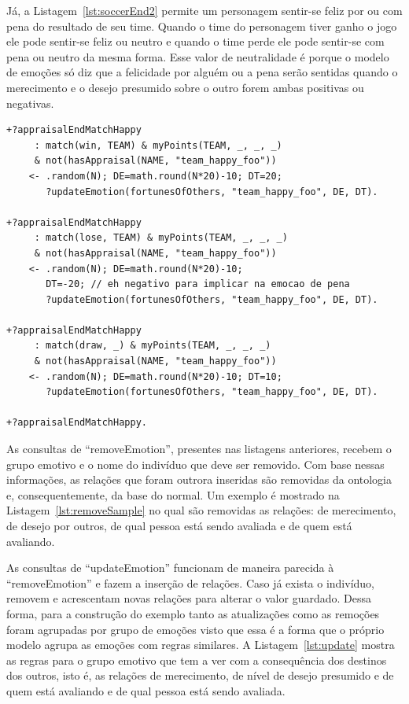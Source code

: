 Já, a Listagem~\ref{lst:soccerEnd2} permite um personagem sentir-se feliz
por ou com pena do resultado de seu time. Quando o time do personagem
tiver ganho o jogo ele pode sentir-se feliz ou neutro e quando o time perde
ele pode sentir-se com pena ou neutro da mesma forma. Esse valor de
neutralidade é porque o modelo de emoções só diz que a felicidade por alguém
ou a pena serão sentidas quando o merecimento e o desejo presumido sobre o
outro forem ambas positivas ou negativas.

\begin{center}
    \begin{minipage}{140mm}
	\lstset{linewidth=140mm}
	\begin{lstlisting}[frame=trbl,
caption=Parte do código do agente referente à avaliação do final do jogo para
as emoções relacionadas com a consequência de eventos para outros.,
label=lst:soccerEnd2]
+?appraisalEndMatchHappy
     : match(win, TEAM) & myPoints(TEAM, _, _, _)
     & not(hasAppraisal(NAME, "team_happy_foo"))
    <- .random(N); DE=math.round(N*20)-10; DT=20;
       ?updateEmotion(fortunesOfOthers, "team_happy_foo", DE, DT).

+?appraisalEndMatchHappy
     : match(lose, TEAM) & myPoints(TEAM, _, _, _)
     & not(hasAppraisal(NAME, "team_happy_foo"))
    <- .random(N); DE=math.round(N*20)-10;
       DT=-20; // eh negativo para implicar na emocao de pena
       ?updateEmotion(fortunesOfOthers, "team_happy_foo", DE, DT).

+?appraisalEndMatchHappy
     : match(draw, _) & myPoints(TEAM, _, _, _)
     & not(hasAppraisal(NAME, "team_happy_foo"))
    <- .random(N); DE=math.round(N*20)-10; DT=10;
       ?updateEmotion(fortunesOfOthers, "team_happy_foo", DE, DT).

+?appraisalEndMatchHappy.
	\end{lstlisting}
    \end{minipage}
\end{center}

As consultas de ``removeEmotion'', presentes nas listagens anteriores, recebem
o grupo emotivo e o nome do indivíduo que deve ser removido. Com base nessas
informações, as relações que foram outrora inseridas são removidas da
ontologia e, consequentemente, da base do \jason normal. Um exemplo é mostrado
na Listagem~\ref{lst:removeSample} no qual são removidas as relações: de
merecimento, de desejo por outros, de qual pessoa está sendo avaliada e de
quem está avaliando.

As consultas de ``updateEmotion'' funcionam de maneira parecida à
``removeEmotion'' e fazem a inserção de relações. Caso já exista o
indivíduo, removem e acrescentam novas relações para alterar o valor guardado.
Dessa forma, para a construção do exemplo tanto as atualizações como as
remoções foram agrupadas por grupo de emoções visto que essa é a forma que
o próprio modelo \occ agrupa as emoções com regras similares. A Listagem~\ref{lst:update}
mostra as regras para o grupo emotivo que tem a ver com a consequência dos
destinos dos outros, isto é, as relações de merecimento, de nível de
desejo presumido e de quem está avaliando e de qual pessoa está sendo
avaliada.

